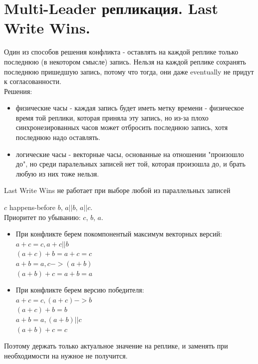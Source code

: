 \section{Multi-Leader репликация. Last Write Wins.}
    Один из способов решения конфликта - оставлять на каждой реплике только последнюю (в некотором смысле) запись. Нельзя на каждой реплике сохранять последнюю пришедшую запись, потому что тогда, они даже eventually не придут к согласованности. \\
    Решения:
    \begin{itemize}
        \item физические часы - каждая запись будет иметь метку времени - физическое время той реплики, которая приняла эту запись, но из-за плохо синхронезированных часов может отбросить последнюю запись, хотя последнюю надо оставлять.
        \item логические часы - векторные часы, основанные на отношении "произошло до", но среди паралельных записей нет той, которая произошла до, и брать любую из них тоже нельзя.
    \end{itemize}
      \begin{definition}
        Last Write Wins не работает при выборе любой из параллельных записей
      \end{definition}
          $c$ happens-before $b$, $a || b$, $a || c$. \\
          Приоритет по убыванию: $c$, $b$, $a$. \\
          \begin{itemize}
          \item При конфликте берем покомпонентый максимум векторных версий: \\
          $a + c = c, a + c || b$\\
          $(a + c) + b = a + c = c$\\
          $a + b = a, c -> (a + b)$\\
          $(a + b) + c = a + b = a$
          \item При конфликте берем версию победителя: \\
          $a + c = c, (a + c) -> b$ \\
          $(a + c) + b = b$ \\
          $a + b = a, (a + b) || c$\\
          $(a + b) + c = c$
          \end{itemize}
        Поэтому держать только актуальное значение на реплике, и заменять при необходимости на нужное не получится. \\
